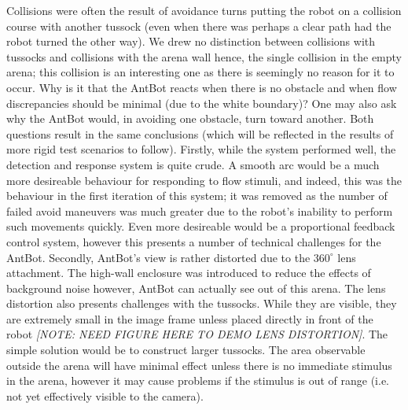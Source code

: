 \documentclass[a4paper,12pt]{article}
\begin{document}
Collisions were often the result of avoidance turns putting the robot on a collision course with another tussock (even when there was perhaps
a clear path had the robot turned the other way). We drew no distinction between collisions with tussocks and collisions with the arena wall
hence, the single collision in the empty arena; this collision is an interesting one as there is seemingly no reason for it to occur. Why
is it that the AntBot reacts when there is no obstacle and when flow discrepancies should be minimal (due to the white boundary)? One may also
ask why the AntBot would, in avoiding one obstacle, turn toward another. Both questions result in the same conclusions (which will be reflected
in the results of more rigid test scenarios to follow). Firstly, while the system performed well, the detection and response system is quite crude.
A smooth arc would be a much more desireable behaviour for responding to flow stimuli, and indeed, this was the behaviour in the first iteration of
this system; it was removed as the number of failed avoid maneuvers was much greater due to the robot's inability to perform such movements quickly.
Even more desireable would be a proportional feedback control system, however this presents a number of technical challenges for the AntBot. Secondly,
AntBot's view is rather distorted due to the $360^{\circ}$ lens attachment. The high-wall enclosure was introduced to reduce the effects of background noise
however, AntBot can actually see out of this arena. The lens distortion also presents challenges with the tussocks. While they are visible, they are
extremely small in the image frame unless placed directly in front of the robot \textit{[NOTE: NEED FIGURE HERE TO DEMO LENS DISTORTION]}. The simple
solution would be to construct larger tussocks. The area observable outside the arena will have minimal effect unless there is no immediate stimulus
in the arena, however it may cause problems if the stimulus is out of range (i.e. not yet effectively visible to the camera).
\end{document}
